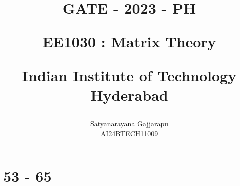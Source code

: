 \documentclass[journal]{IEEEtran}
\begin{document}

\vspace{3cm}




\title{
GATE - 2023 - PH

\large{EE1030 : Matrix Theory}

Indian Institute of Technology Hyderabad
}
\author{Satyanarayana Gajjarapu

AI24BTECH11009
}	





\maketitle




\bigskip

\renewcommand{\thefigure}{\theenumi}
\renewcommand{\thetable}{\theenumi}


\section{53 - 65}
\end{document}
